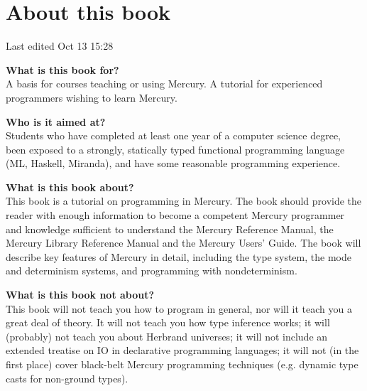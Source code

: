 \documentclass[a4paper,11pt,notitlepage,onecolumn]{book}
\begin{document}
% 

\newcommand{\polytexopenbrace}%
{\{}
\newcommand{\polytexclosebrace}%
{\}}
\newcommand{\polytexampersand}%
{\&}

\setcounter{chapter}{-1}



\chapter{About this book}

Last edited Oct 13 15:28

\textbf{What is this book for?}
\\
A basis for courses teaching or using Mercury.  A tutorial for
experienced programmers wishing to learn Mercury.

\textbf{Who is it aimed at?}
\\
Students who have completed at least one year of a computer science
degree, been exposed to a strongly, statically typed functional programming
language (\eg ML, Haskell, Miranda), and have some reasonable programming
experience.

\textbf{What is this book about?}
\\
This book is a tutorial on programming in Mercury.  The book should
provide the reader with enough information to become a competent Mercury
programmer and knowledge sufficient to understand the Mercury Reference
Manual, the Mercury Library Reference Manual and the Mercury Users' Guide.
The book will describe key features of Mercury in detail, including the type
system, the mode and determinism systems, and programming with
nondeterminism.

\textbf{What is this book not about?}
\\
This book will not teach you how to program in general, nor will it teach
you a great deal of theory.  It will not teach you how type inference works;
it will (probably) not teach you about Herbrand universes; it will not
include an extended treatise on IO in declarative programming languages; it
will not (in the first place) cover black-belt Mercury programming
techniques (e.g. dynamic type casts for non-ground types).
\end{document}
